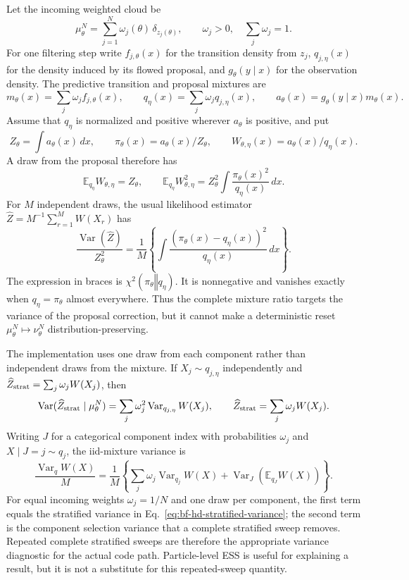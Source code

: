 Let the incoming weighted cloud be
\[
 \mu_\theta^N=\sum_{j=1}^N\omega_j(\theta)\,\delta_{z_j(\theta)},
 \qquad \omega_j>0,\quad\sum_j\omega_j=1.
\]
For one filtering step write $f_{j,\theta}(x)$ for the transition density
from $z_j$, $q_{j,\eta}(x)$ for the density induced by its flowed proposal,
and $g_\theta(y\mid x)$ for the observation density.  The predictive
transition and proposal mixtures are
\[
 m_\theta(x)=\sum_j\omega_j f_{j,\theta}(x),\qquad
 q_\eta(x)=\sum_j\omega_j q_{j,\eta}(x),\qquad
 a_\theta(x)=g_\theta(y\mid x)m_\theta(x).
\]
Assume that $q_\eta$ is normalized and positive wherever $a_\theta$ is
positive, and put
\[
 Z_\theta=\int a_\theta(x)\,dx,\qquad
 \pi_\theta(x)=a_\theta(x)/Z_\theta,\qquad
 W_{\theta,\eta}(x)=a_\theta(x)/q_\eta(x).
\]
A draw from the proposal therefore has
\[
 \mathbb E_{q_\eta}W_{\theta,\eta}=Z_\theta,\qquad
 \mathbb E_{q_\eta}W_{\theta,\eta}^2
 =Z_\theta^2\int\frac{\pi_\theta(x)^2}{q_\eta(x)}\,dx.
\]
For $M$ independent draws, the usual likelihood estimator
$\widehat Z=M^{-1}\sum_{r=1}^M W(X_r)$ has
\begin{equation}
 \frac{\operatorname{Var}(\widehat Z)}{Z_\theta^2}
 =\frac{1}{M}\left\{\int
   \frac{(\pi_\theta(x)-q_\eta(x))^2}{q_\eta(x)}\,dx\right\}.
 \label{eq:bf-hd-chi-square-proposal-variance}
\end{equation}
The expression in braces is $\chi^2(\pi_\theta\mathbin\Vert q_\eta)$.
It is nonnegative and vanishes exactly when $q_\eta=\pi_\theta$ almost
everywhere.  Thus the complete mixture ratio targets the variance of the
proposal correction, but it cannot make a deterministic reset
$\mu_\theta^N\mapsto\nu_\theta^N$ distribution-preserving.

The implementation uses one draw from each component rather than independent
draws from the mixture.  If $X_j\sim q_{j,\eta}$ independently and
$\widehat Z_{\rm strat}=\sum_j\omega_j W(X_j)$, then
\begin{equation}
 \operatorname{Var}(\widehat Z_{\rm strat}\mid\mu_\theta^N)
   =\sum_j\omega_j^2\operatorname{Var}_{q_{j,\eta}}W(X_j),
 \qquad
 \widehat Z_{\rm strat}=\sum_j\omega_jW(X_j).
 \label{eq:bf-hd-stratified-variance}
\end{equation}
Writing $J$ for a categorical component index with probabilities $\omega_j$
and $X\mid J=j\sim q_j$, the iid-mixture variance is
\[
 \frac{\operatorname{Var}_{q}W(X)}{M}
 =\frac{1}{M}\left\{\sum_j\omega_j
       \operatorname{Var}_{q_j}W(X)+\operatorname{Var}_{J}
       \left(\mathbb E_{q_J}W(X)\right)\right\}.
\]
For equal incoming weights $\omega_j=1/N$ and one draw per component, the
first term equals the stratified variance in
Eq.~\eqref{eq:bf-hd-stratified-variance}; the second term is the component
selection variance that a complete stratified sweep removes.
Repeated complete stratified sweeps are therefore the appropriate variance
diagnostic for the actual code path.  Particle-level ESS is useful for
explaining a result, but it is not a substitute for this repeated-sweep
quantity.

